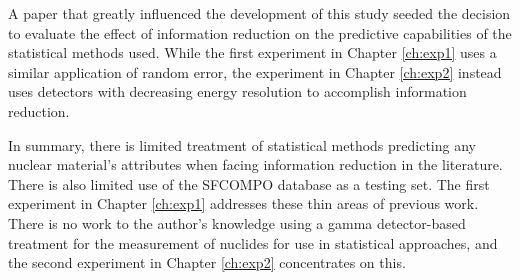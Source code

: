 A paper that greatly influenced the development of this study
\cite{dayman_feasibility_2013} seeded the decision to evaluate the effect of
information reduction on the predictive capabilities of the statistical methods
used.  While the first experiment in Chapter \ref{ch:exp1} uses a similar
application of random error, the experiment in Chapter \ref{ch:exp2} instead
uses detectors with decreasing energy resolution to accomplish information
reduction.

In summary, there is limited treatment of statistical methods predicting any
nuclear material's attributes when facing information reduction in the
literature.  There is also limited use of the \gls{SFCOMPO} database as a
testing set.  The first experiment in Chapter \ref{ch:exp1} addresses these
thin areas of previous work.  There is no work to the author's knowledge using
a gamma detector-based treatment for the measurement of nuclides for use in
statistical approaches, and the second experiment in Chapter \ref{ch:exp2}
concentrates on this.
